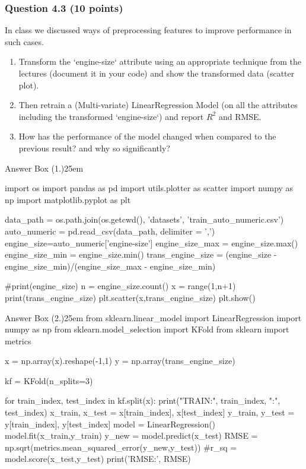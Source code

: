 \documentclass[12pt]{article}
\begin{document}
\subsubsection*{Question 4.3 (10 points)}
In class we discussed ways of preprocessing features to improve performance in such cases.
\begin{enumerate}
    \item [1.] [Code] Transform the `engine-size` attribute using an appropriate technique from the lectures (document it in your code) and show the transformed data (scatter plot).
    \item [2.] [Code] Then retrain a (Multi-variate) LinearRegression Model (on all the attributes including the transformed `engine-size`) and report $R^2$ and RMSE. 
    \item [3.] [Text] How has the performance of the model changed when compared to the previous result? and why so significantly?
\end{enumerate}

\begin{code}{Answer Box (1.)}{25em}

import os
import pandas as pd
import utils.plotter as scatter
import numpy as np
import matplotlib.pyplot as plt

data_path = os.path.join(os.getcwd(), 'datasets', 'train_auto_numeric.csv')
auto_numeric = pd.read_csv(data_path, delimiter = ',')
engine_size=auto_numeric['engine-size']
engine_size_max = engine_size.max()
engine_size_min = engine_size.min()
trans_engine_size = (engine_size - engine_size_min)/(engine_size_max - engine_size_min)

#print(engine_size)
n = engine_size.count()
x = range(1,n+1)
print(trans_engine_size)
plt.scatter(x,trans_engine_size)
plt.show()

\end{code}


\begin{code}{Answer Box (2.)}{25em}
from sklearn.linear_model import LinearRegression
import numpy as np
from sklearn.model_selection import KFold
from sklearn import metrics

x = np.array(x).reshape(-1,1)
y = np.array(trans_engine_size)

kf = KFold(n_splits=3)

for train_index, test_index in kf.split(x):
    print("TRAIN:", train_index, "\nTEST:", test_index)
    x_train, x_test = x[train_index], x[test_index]
    y_train, y_test = y[train_index], y[test_index]
    model = LinearRegression()
    model.fit(x_train,y_train)
    y_new = model.predict(x_test)
    RMSE = np.sqrt(metrics.mean_squared_error(y_new,y_test))
    #r_sq = model.score(x_test,y_test)
    print('RMSE:', RMSE)
\end{code}
\end{document}
